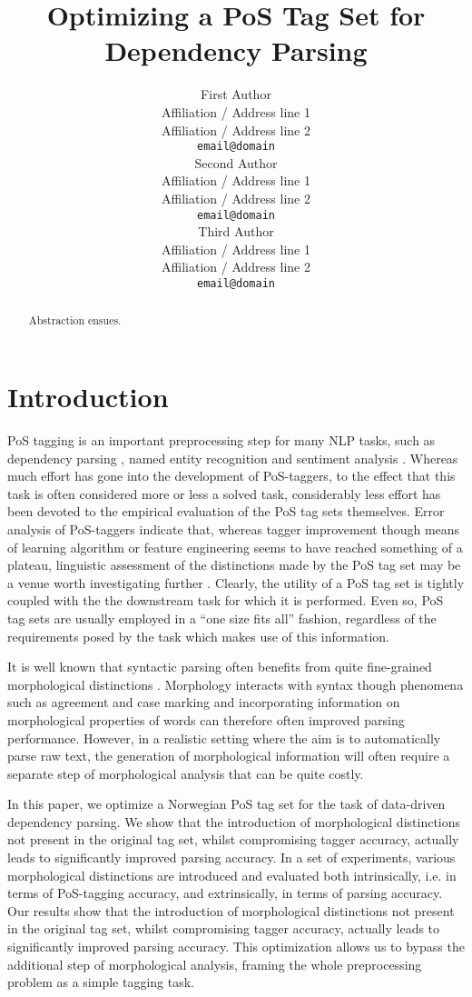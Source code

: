 \documentclass[11pt,a4paper]{article}
\title{Optimizing a PoS Tag Set for Dependency Parsing}
\author{First Author \\
  Affiliation / Address line 1 \\
  Affiliation / Address line 2 \\
  {\tt email@domain} \\\And
  Second Author \\
  Affiliation / Address line 1 \\
  Affiliation / Address line 2 \\
  {\tt email@domain}  \\\And
  Third Author \\
  Affiliation / Address line 1 \\
  Affiliation / Address line 2 \\
  {\tt email@domain} \\}
\date{}
\begin{document}
\maketitle
\begin{abstract}
Abstraction ensues.
\end{abstract}


\section{Introduction}
\label{sec:intro}
PoS tagging is an important preprocessing step for many NLP tasks,
such as dependency parsing \cite{Niv:Hal:Kub:07,Haj:Cia:Joh:09}, named
entity recognition \cite{Tjo:DeM:03} and sentiment analysis
\cite{Wil:Wie:Hof:09}. Whereas much effort has gone into the
development of PoS-taggers, to the effect that this task is often
considered more or less a solved task, considerably less effort has
been devoted to the empirical evaluation of the PoS tag sets
themselves. Error analysis of PoS-taggers indicate that, whereas
tagger improvement though means of learning algorithm or feature
engineering seems to have reached something of a plateau, linguistic
assessment of the distinctions made by the PoS tag set may be a venue
worth investigating further \cite{Man:11}.  Clearly, the utility of a
PoS tag set is tightly coupled with the the downstream task for which
it is performed. Even so, PoS tag sets are usually employed in a ``one
size fits all'' fashion, regardless of the requirements posed by the
task which makes use of this information.

It is well known that syntactic parsing often benefits from quite
fine-grained morphological distinctions
\cite{Zha:Niv:11,See:Kuh:13}. Morphology interacts with syntax though
phenomena such as agreement and case marking and incorporating
information on morphological properties of words can therefore often
improved parsing performance. However, in a realistic setting where
the aim is to automatically parse raw text, the generation of
morphological information will often require a separate step of
morphological analysis that can be quite costly.

In this paper, we optimize a Norwegian PoS tag set for the task of
data-driven dependency parsing.  We show that the introduction of
morphological distinctions not present in the original tag set, whilst
compromising tagger accuracy, actually leads to significantly improved
parsing accuracy.  In a set of experiments, various morphological
distinctions are introduced and evaluated both intrinsically, i.e. in
terms of PoS-tagging accuracy, and extrinsically, in terms of parsing
accuracy.  Our results show that the introduction of morphological
distinctions not present in the original tag set, whilst compromising
tagger accuracy, actually leads to significantly improved parsing
accuracy. This optimization allows us to bypass the additional step of
morphological analysis, framing the whole preprocessing problem as a
simple tagging task.
\end{document}
